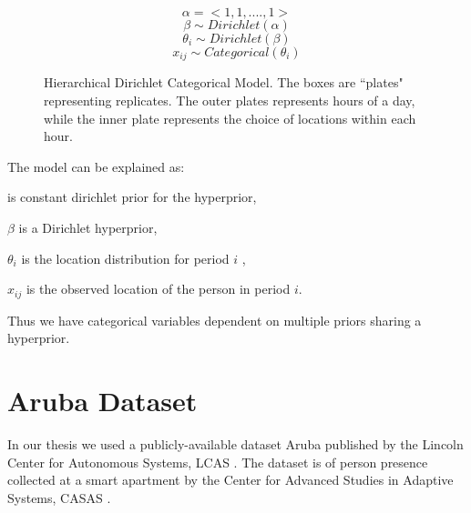 \noindent
\begin{figure}[htp]

\begin{minipage}{0.3\textwidth}
\centering


\end{minipage}%
\begin{minipage}{0.7\textwidth}

\begin{equation*}
	\alpha = <1, 1, .... , 1 > 
\end{equation*}
\begin{equation*}
	\beta \sim Dirichlet(\alpha)
\end{equation*}
\begin{equation*}
	\theta_i  \sim Dirichlet(\beta)
\end{equation*}
\begin{equation*}
	x_{ij} \sim Categorical(\theta_i)
\end{equation*}
\end{minipage}
\caption{Hierarchical Dirichlet Categorical Model. The boxes are ``plates" representing replicates. The outer plates represents hours of a day, while the inner plate represents the choice of locations within each hour.}
\label{hdcm}
\end{figure}

The model can be explained as:

	\boldmath{$\alpha$} is  constant dirichlet prior for the hyperprior, 
	
	$\beta$ is a Dirichlet hyperprior,
	
	$\theta_i$ is the location distribution for period $i$  ,
	
	$x_{ij}$ is the observed location of the person in period $i$.
	
Thus we have categorical variables dependent on multiple priors sharing a hyperprior.


\section{Aruba Dataset}
In our thesis we used a  publicly-available  dataset  Aruba published by the Lincoln Center for Autonomous Systems, LCAS . The dataset is of person presence collected at a smart apartment by the Center for Advanced Studies in Adaptive Systems, CASAS .

